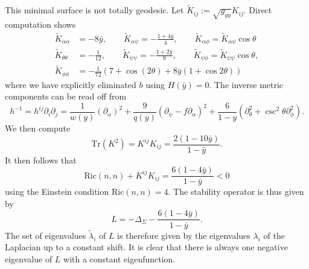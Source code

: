 \documentclass[11pt]{amsart}
\theoremstyle{plain}
\theoremstyle{definition}
\numberwithin{equation}{section}
\begin{document}
This minimal surface is not totally geodesic. Let $\tilde{K}_{ij}:=\sqrt{g_{yy}} K_{ij}$. Direct computation shows 
\begin{equation}
    \begin{aligned}
        \tilde{K}_{\alpha\alpha} &= - 8\bar{y}, \qquad \tilde{K}_{\alpha\psi} = -\frac{1 + 4\bar{y}}{4}, \qquad \tilde{K}_{\alpha\phi} = \tilde{K}_{\alpha\psi} \cos\theta \\
        \tilde{K}_{\theta\theta} &= -\frac{1}{12}, \qquad \tilde{K}_{\psi\psi} = -\frac{1 + 2\bar{y}}{9}, \qquad \tilde{K}_{\psi\phi} = \tilde{K}_{\psi\psi} \cos\theta, \\ \tilde{K}_{\phi\phi} &= -\frac{1}{72} \left(7 + \cos(2\theta) + 8\bar{y} (1 + \cos2\theta)\right)
    \end{aligned}
\end{equation} where we have explicitly eliminated $b$ using $H(\bar{y}) =0$. The inverse metric components can be read off from 
\begin{equation}
    h^{-1} = h^{ij}\partial_i \partial_j = \frac{1}{w(y)} (\partial_\alpha)^2 + \frac{9}{q(y)} (\partial_\psi - f\partial_\alpha)^2 + \frac{6}{1-y} (\partial_\theta^2 + \csc^2\theta \partial_\phi^2).
\end{equation} We then compute
\begin{equation}
    \text{Tr}(K^2) = K^{ij}K_{ij} = \frac{2(1 - 10\bar{y})}{1 - \bar{y}}.
\end{equation} It then follows that
\begin{equation}
    \text{Ric}(n,n) + K^{ij}K_{ij} = \frac{6(1 - 4\bar{y})}{1 - \bar{y}} < 0
\end{equation} using the Einstein condition $\text{Ric}(n,n) = 4$. The stability operator is thus given by
\begin{equation}
    L = -\Delta_\Sigma - \frac{6(1 - 4\bar{y})}{1 - \bar{y}}.
\end{equation} The set of eigenvalues $\tilde\lambda_i$ of $L$ is therefore given by the eigenvalues $\lambda_i$ of the Laplacian up to a constant shift. It is clear that there is always one negative eigenvalue of $L$ with a constant eigenfunction.  
\end{document}
